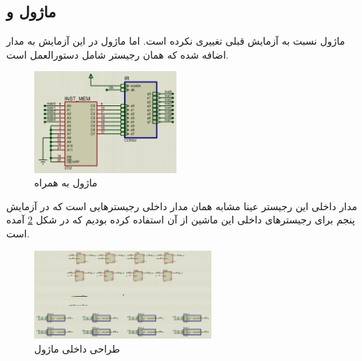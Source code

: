 \documentclass[12pt,onecolumn,a4paper,fleqn]{article}
\begin{document}
	\subsection{ماژول  و }
	ماژول 
	نسبت به آزمایش قبلی تغییری نکرده است. اما ماژول
	در این آزمایش به مدار اضافه شده که همان رجیستر شامل دستورالعمل است.
	\begin{figure}[H]
		\centering
		\includegraphics[width=0.48\textwidth]{source/instmem_interface.png}
		\caption{ماژول  به همراه }
		\label{fig:instmem_interface}
	\end{figure}
	مدار داخلی این رجیستر عینا مشابه همان مدار داخلی رجیسترهایی است که در آزمایش پنجم برای رجیستر‌های داخلی این ماشین از آن‌ استفاده کرده بودیم که در شکل \ref{fig:is-inner} آمده است.
	\begin{figure}[H]
		\centering
		\includegraphics[width=0.6\textwidth]{source/is_inner.png}
		\caption{طراحی داخلی ماژول }
		\label{fig:is-inner}
	\end{figure}
	
\end{document}
